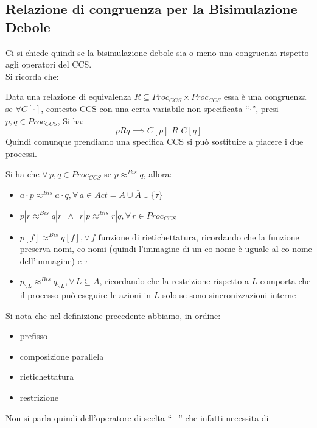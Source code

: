 \subsection{Relazione di congruenza per la Bisimulazione Debole}
Ci si chiede quindi se la bisimulazione debole sia o meno una congruenza
rispetto agli operatori del CCS.\\
Si ricorda che:
\begin{definizione}
  Data una relazione di equivalenza $R\subseteq Proc_{CCS}\times Proc_{CCS}$
  essa è una congruenza se $\forall C[\cdot]$, contesto CCS con una certa
  variabile non specificata ``$\cdot$'', presi $p, q\in Proc_{CCS}$, Si ha:
  \[pRq\implies C[p]\,\, R\,\, C[q]\]
  Quindi comunque prendiamo una specifica CCS si può sostituire a piacere i due
  processi. 
\end{definizione} \vspace{5mm} %
\begin{definizione}
  Si ha che $\forall\, p, q\in Proc_{CCS}$ se $p\approx^{Bis}q$, allora:
  \begin{itemize}
    \item $a\cdot p\approx^{Bis} a\cdot q,\forall\, a\in
    Act=A\cup\overline{A}\cup\{\tau\}$ 
    \item $p|r\approx^{Bis}q|r\,\,\,\land \,\,\,
    r|p\approx^{Bis}r|q,\forall\, r\in Proc_{CCS}$  
    \item $p[f]\approx^{Bis}q[f],\forall\, f\mbox{ funzione di rietichettatura}$,
    ricordando che la funzione preserva nomi, co-nomi (quindi l'immagine di un
    co-nome è uguale al co-nome dell'immagine) e $\tau$
    \item $p_{\backslash L}\approx^{Bis}q_{\backslash L},\forall\, L\subseteq A$,
    ricordando che la restrizione rispetto a $L$ comporta che il processo può
    eseguire le azioni in $L$ solo se sono sincronizzazioni interne
  \end{itemize}
\end{definizione} \vspace{5mm} %
Si nota che nel definizione precedente abbiamo, in ordine:
\begin{itemize}
  \item prefisso
  \item composizione parallela
  \item rietichettatura
  \item restrizione
\end{itemize}
Non si parla quindi dell'operatore di scelta ``+'' che infatti necessita di
